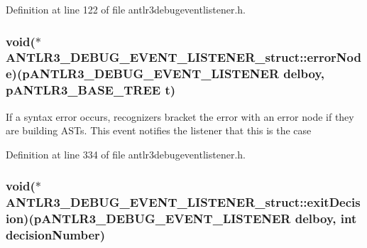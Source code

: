 Definition at line 122 of file antlr3debugeventlistener.\-h.

\hypertarget{struct_a_n_t_l_r3___d_e_b_u_g___e_v_e_n_t___l_i_s_t_e_n_e_r__struct_a0713f61fbfbae26d65370d89d4908e5a}{
\subsubsection[{error\-Node}]{\setlength{\rightskip}{0pt plus 5cm}void($\ast$ A\-N\-T\-L\-R3\-\_\-\-D\-E\-B\-U\-G\-\_\-\-E\-V\-E\-N\-T\-\_\-\-L\-I\-S\-T\-E\-N\-E\-R\-\_\-struct\-::error\-Node)({\bf p\-A\-N\-T\-L\-R3\-\_\-\-D\-E\-B\-U\-G\-\_\-\-E\-V\-E\-N\-T\-\_\-\-L\-I\-S\-T\-E\-N\-E\-R} delboy, {\bf p\-A\-N\-T\-L\-R3\-\_\-\-B\-A\-S\-E\-\_\-\-T\-R\-E\-E} {\bf t})}}\label{struct_a_n_t_l_r3___d_e_b_u_g___e_v_e_n_t___l_i_s_t_e_n_e_r__struct_a0713f61fbfbae26d65370d89d4908e5a}
If a syntax error occurs, recognizers bracket the error with an error node if they are building A\-S\-Ts. This event notifies the listener that this is the case 

Definition at line 334 of file antlr3debugeventlistener.\-h.

\hypertarget{struct_a_n_t_l_r3___d_e_b_u_g___e_v_e_n_t___l_i_s_t_e_n_e_r__struct_ad4ffe64fde8fdc9577829f6f6921caaa}{
\subsubsection[{exit\-Decision}]{\setlength{\rightskip}{0pt plus 5cm}void($\ast$ A\-N\-T\-L\-R3\-\_\-\-D\-E\-B\-U\-G\-\_\-\-E\-V\-E\-N\-T\-\_\-\-L\-I\-S\-T\-E\-N\-E\-R\-\_\-struct\-::exit\-Decision)({\bf p\-A\-N\-T\-L\-R3\-\_\-\-D\-E\-B\-U\-G\-\_\-\-E\-V\-E\-N\-T\-\_\-\-L\-I\-S\-T\-E\-N\-E\-R} delboy, int decision\-Number)}}\label{struct_a_n_t_l_r3___d_e_b_u_g___e_v_e_n_t___l_i_s_t_e_n_e_r__struct_ad4ffe64fde8fdc9577829f6f6921caaa}


